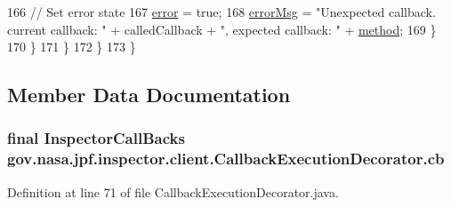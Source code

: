 \begin{DoxyCode}
166             \textcolor{comment}{// Set error state}
167             \hyperlink{classgov_1_1nasa_1_1jpf_1_1inspector_1_1client_1_1_callback_execution_decorator_a70e054c25db8a40468c6fea73ad2ea22}{error} = \textcolor{keyword}{true};
168             \hyperlink{classgov_1_1nasa_1_1jpf_1_1inspector_1_1client_1_1_callback_execution_decorator_a4e28619ff9db004a84b9186e9b171332}{errorMsg} = \textcolor{stringliteral}{"Unexpected callback. current callback: "} + calledCallback + \textcolor{stringliteral}{", expected
       callback: "} + \hyperlink{classgov_1_1nasa_1_1jpf_1_1inspector_1_1client_1_1_callback_execution_decorator_a4c6a37dec58589fdd22ea4786d73752d}{method};
169           \}
170         \}
171       \}
172     \}
173   \}
\end{DoxyCode}


\subsection{Member Data Documentation}
\subsubsection[{\texorpdfstring{cb}{cb}}]{\setlength{\rightskip}{0pt plus 5cm}final {\bf Inspector\+Call\+Backs} gov.\+nasa.\+jpf.\+inspector.\+client.\+Callback\+Execution\+Decorator.\+cb\hspace{0.3cm}{\ttfamily [protected]}}\hypertarget{classgov_1_1nasa_1_1jpf_1_1inspector_1_1client_1_1_callback_execution_decorator_a3368e5a926aa09b3c9bd244ee790f3f3}{}\label{classgov_1_1nasa_1_1jpf_1_1inspector_1_1client_1_1_callback_execution_decorator_a3368e5a926aa09b3c9bd244ee790f3f3}


Definition at line 71 of file Callback\+Execution\+Decorator.\+java.

